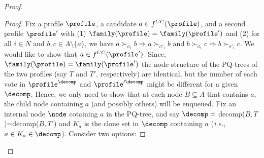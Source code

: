 \begin{proof}
\begin{proof}
    Fix a profile $\profile$, a candidate $a \in f^{CC}(\profile)$, and a second profile $\profile'$ with (1) $\family(\profile)=\family(\profile')$ and (2) for all $i \in N$ and $b,c \in A \setminus\{a\}$, we have $a \succ_{\sigma_i} b \Rightarrow a \succ_{\sigma'_i} b$ and $b \succ_{\sigma_i} c \Rightarrow b \succ_{\sigma'_i} c$. We would like to show that $a \in f^{CC}(\profile').$ Since, $\family(\profile)=\family(\profile')$ the node structure of the PQ-trees of the two profiles (say $T$ and $T'$, respectively) are identical, but the number of each vote in $\profile^\decomp$ and $\profile'^\decomp$ might be different for a given $\decomp$. Hence, we only need to show that at each node $B \subseteq A$ that contains $a$, the child node containing $a$ (and possibly others) will be enqueued. Fix an internal node $\node$ cotaining $a$ in the PQ-tree, and say $\decomp=$ decomp($B,T$)=decomp($B,T'$) and $K_a$ is the clone set in $\decomp$ containing $a$ (\emph{i.e.}, $a \in K_a \in \decomp$). Consider two options:


\end{proof}
\end{proof}
